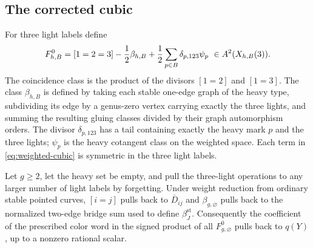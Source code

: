 \subsection{The corrected cubic}

For three light labels define
\begin{equation}\label{eq:weighted-cubic}
 F^0_{h,B}
   =[1=2=3]-\frac12\beta_{h,B}
             +\frac12\sum_{p\in B}\delta_{p,123}\psi_p
       \ \in A^2(X_{h,B}(3)).
\end{equation}
The coincidence class is the product of the divisors $[1=2]$ and
$[1=3]$.  The class $\beta_{h,B}$ is defined by taking each stable
one-edge graph of the heavy type, subdividing its edge by a genus-zero
vertex carrying exactly the three lights, and summing the resulting
gluing classes divided by their graph automorphism orders.
The divisor $\delta_{p,123}$ has a tail containing exactly the heavy
mark $p$ and the three lights; $\psi_p$ is the heavy cotangent class on
the weighted space.  Each term in \eqref{eq:weighted-cubic} is symmetric
in the three light labels.




\begin{lemma}\label{lem:weighted-pullback}
Let $g\geq2$, let the heavy set be empty, and pull the three-light
operations to any larger number of light labels by forgetting.
Under weight reduction from ordinary stable pointed curves,
$[i=j]$ pulls back to $\bar D_{ij}$ and $\beta_{g,\varnothing}$
pulls back to the normalized two-edge bridge sum used to define
$\beta_J^{\mathrm{st}}$.
Consequently the coefficient of the prescribed color word in the
signed product of all $F^0_{g,\varnothing}$ pulls back to $q(Y)$,
up to a nonzero rational scalar.
\end{lemma}

